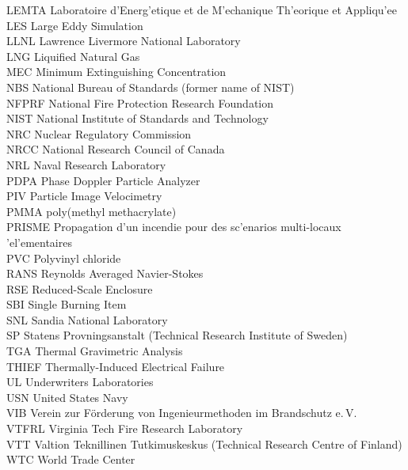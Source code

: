 \documentclass[11pt]{book}
\begin{document}
\begin{tabbing}
LEMTA \> Laboratoire d'Energ\a'{e}tique et de M\a'{e}chanique Th\a'{e}orique et Appliqu\a'{e}e \\
LES \> Large Eddy Simulation \\
LLNL \> Lawrence Livermore National Laboratory \\
LNG \> Liquified Natural Gas \\
MEC \> Minimum Extinguishing Concentration \\
NBS \> National Bureau of Standards (former name of NIST) \\
NFPRF \> National Fire Protection Research Foundation \\
NIST \> National Institute of Standards and Technology \\
NRC \> Nuclear Regulatory Commission \\
NRCC \> National Research Council of Canada \\
NRL \> Naval Research Laboratory \\
PDPA \> Phase Doppler Particle Analyzer \\
PIV \> Particle Image Velocimetry \\
PMMA \> poly(methyl methacrylate) \\
PRISME \> Propagation d'un incendie pour des sc\a'{e}narios multi-locaux \a'{e}l\a'{e}mentaires \\
PVC \> Polyvinyl chloride \\
RANS \> Reynolds Averaged Navier-Stokes \\
RSE \> Reduced-Scale Enclosure \\
SBI \>  Single Burning Item \\
SNL \> Sandia National Laboratory \\
SP \>  Statens Provningsanstalt (Technical Research Institute of Sweden) \\
TGA \> Thermal Gravimetric Analysis \\
THIEF \> Thermally-Induced Electrical Failure \\
UL  \> Underwriters Laboratories \\
USN \> United States Navy \\
VIB \> Verein zur F\"{o}rderung von Ingenieurmethoden im Brandschutz e.\,V. \\
VTFRL \> Virginia Tech Fire Research Laboratory \\
VTT \> Valtion Teknillinen Tutkimuskeskus (Technical Research Centre of Finland) \\
WTC \> World Trade Center \\
\end{tabbing}
\end{document}

